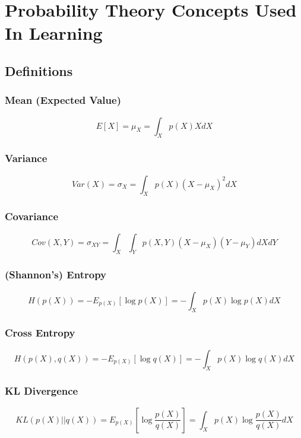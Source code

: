 \documentclass{article}
\numberwithin{equation}{subsection}
\begin{document}
\section{Probability Theory Concepts Used In Learning}
\subsection{Definitions}
\subsubsection{Mean (Expected Value)}
\begin{equation}
    E[X] = \mu_X = \int_X p(X)X dX
\end{equation}
\subsubsection{Variance}
\begin{equation}
    Var(X) = \sigma_X = \int_X p(X)(X-\mu_X)^2 dX
\end{equation}
\subsubsection{Covariance}
\begin{equation}
    Cov(X,Y) = \sigma_{XY} = \int_X \int_Y p(X,Y)(X-\mu_X)(Y-\mu_Y) dX dY
\end{equation}
\subsubsection{(Shannon's) Entropy}
\begin{equation}
H(p(X)) = -E_{p(X)}[\log p(X)] = -\int_X p(X)\log p(X) dX 
\end{equation}
\subsubsection{Cross Entropy}
\begin{equation}
H(p(X), q(X)) = -E_{p(X)}[\log q(X)] = -\int_X p(X)\log q(X) dX   
\end{equation}
\subsubsection{KL Divergence}
\begin{equation}
KL(p(X) || q(X)) = E_{p(X)}[\log\frac{p(X)}{q(X)}] = \int_X p(X)\log\frac{p(X)}{q(X)} dX    
\end{equation}
\end{document}
